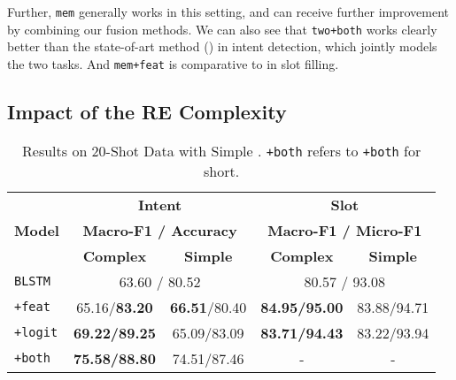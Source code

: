 Further, \texttt{mem} generally works in this setting, and can receive further improvement
by combining our fusion methods.
We can also see that \texttt{two+both} works clearly better than the state-of-art method (\LL) in intent detection, which jointly models the two tasks. And \texttt{mem+feat} is comparative to \LL in slot filling.

\subsection{Impact of the RE Complexity}
\label{sec_complexity}
\begin{table}
\setlength{\tabcolsep}{0.23em}
\centering
\small{
\begin{tabular}{|l|c|c|c|c|}

\hline
\multirow{3}{*}{\textbf{Model}}  & \multicolumn{2}{|c|}{\textbf{Intent}} & \multicolumn{2}{|c|}{\textbf{Slot}}  \\
\cline{2-5}
  & \multicolumn{2}{|c|}{\textbf{\scriptsize Macro-F1 / Accuracy}} & \multicolumn{2}{|c|}{\textbf{\scriptsize Macro-F1 / Micro-F1}}  \\
\cline{2-5}
  & \textbf{\scriptsize Complex} & \textbf{\scriptsize Simple} & \textbf{\scriptsize Complex} & \textbf{\scriptsize Simple} \\
\hline
\rowcolor{Gray} \texttt{BLSTM} & \multicolumn{2}{|c|}{63.60 / 80.52} & \multicolumn{2}{|c|}{80.57 / 93.08}  \\
\hline
\texttt{+feat }& 65.16/\textbf{83.20} & \textbf{66.51}/80.40 & \textbf{84.95/95.00} & 83.88/94.71 \\
\hline
\rowcolor{Gray} \texttt{+logit} & \textbf{69.22/89.25} & 65.09/83.09 & \textbf{83.71/94.43} & 83.22/93.94  \\
\hline
\texttt{+both} & \textbf{75.58/88.80} & 74.51/87.46 & - & - \\
\hline
\end{tabular}
} \caption{Results on 20-Shot Data with Simple \REs. \texttt{+both} refers to \ptatt\texttt{+both} for short.} \label{tab_simple}
\vspace{-1em}
\end{table}

